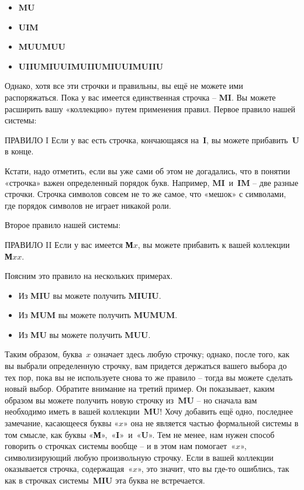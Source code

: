 \documentclass[../main.tex]{subfiles}
\begin{document}
\begin{itemize}[label={}, noitemsep, topsep=2pt, leftmargin=\parindent]
    \item \textbf{MU}
    \item \textbf{UIM}
    \item \textbf{MUUMUU}
    \item \textbf{UIIUMIUUIMUIIUMIUUIMUIIU}
\end{itemize}

Однако, хотя все эти строчки и правильны, вы ещё не можете ими распоряжаться. Пока у вас имеется единственная строчка \--- \textbf{MI}\@. Вы можете расширить вашу «коллекцию» путем применения правил. Первое правило нашей системы:

\begin{mybox}{ПРАВИЛО I}
    Если у вас есть строчка, кончающаяся на~\textbf{I}, вы можете прибавить~\textbf{U} в конце.
\end{mybox}

Кстати, надо отметить, если вы уже сами об этом не догадались, что в понятии «строчка» важен определенный порядок букв. Например, \textbf{MI}~и~\textbf{IM} \--- две разные строчки. Строчка символов совсем не то же самое, что «мешок» с символами, где порядок символов не играет никакой роли.

Второе правило нашей системы:

\begin{mybox}{ПРАВИЛО II}
    Если у вас имеется \textbf{М}$x$, вы можете прибавить к вашей коллекции \textbf{М}$xx$.
\end{mybox}

Поясним это правило на нескольких примерах.

\begin{itemize}[label={}, noitemsep, topsep=6pt, leftmargin=\parindent]
    \item Из \textbf{MIU} вы можете получить \textbf{MIUIU}.
    \item Из \textbf{MUM} вы можете получить \textbf{MUMUM}.
    \item Из \textbf{MU} вы можете получить \textbf{MUU}.
\end{itemize}

Таким образом, буква~$x$ означает здесь любую строчку; однако, после того, как вы выбрали определенную строчку, вам придется держаться вашего выбора до тех пор, пока вы не используете снова то же правило \--- тогда вы можете сделать новый выбор. Обратите внимание на третий пример. Он показывает, каким образом вы можете получить новую строчку из~\textbf{MU} \--- но сначала вам необходимо иметь в вашей коллекции~\textbf{MU}! Хочу добавить ещё одно, последнее замечание, касающееся буквы «$x$» она не является частью формальной системы в том смысле, как буквы «\textbf{М}»,~«\textbf{I}»~и~«\textbf{U}». Тем не менее, нам нужен способ говорить о строчках системы вообще \--- и в этом нам помогает~«$x$», символизирующий любую произвольную строчку. Если в вашей коллекции оказывается строчка, содержащая~«$x$», это значит, что вы где-то ошиблись, так как в строчках системы~\textbf{MIU} эта буква не встречается.
\end{document}
